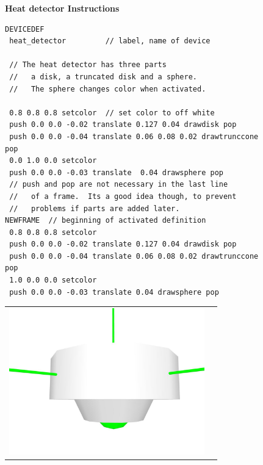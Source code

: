 \documentclass[11pt,twoside]{book}
\newcommand{\figoptions}{hbp}
\newcommand{\figheightA}{2.5in}
\begin{document}
\begin{figure}[\figoptions]
{\bf Heat detector Instructions}\\
{\small
\begin{Verbatim}[frame=single,rulecolor=\color{blue},
framerule=3pt,framesep=1pc,fillcolor=\color{yellow}]
DEVICEDEF
 heat_detector         // label, name of device

 // The heat detector has three parts
 //   a disk, a truncated disk and a sphere.
 //   The sphere changes color when activated.

 0.8 0.8 0.8 setcolor  // set color to off white
 push 0.0 0.0 -0.02 translate 0.127 0.04 drawdisk pop
 push 0.0 0.0 -0.04 translate 0.06 0.08 0.02 drawtrunccone pop
 0.0 1.0 0.0 setcolor
 push 0.0 0.0 -0.03 translate  0.04 drawsphere pop
 // push and pop are not necessary in the last line
 //   of a frame.  Its a good idea though, to prevent
 //   problems if parts are added later.
NEWFRAME  // beginning of activated definition
 0.8 0.8 0.8 setcolor
 push 0.0 0.0 -0.02 translate 0.127 0.04 drawdisk pop
 push 0.0 0.0 -0.04 translate 0.06 0.08 0.02 drawtrunccone pop
 1.0 0.0 0.0 setcolor
 push 0.0 0.0 -0.03 translate 0.04 drawsphere pop
\end{Verbatim}
}
\begin{center}
\begin{tabular}{cc}
 \includegraphics[height=\figheightA]{figures/heatdetector_inact}&

\end{tabular}
\end{center}
\end{figure}
\end{document}
